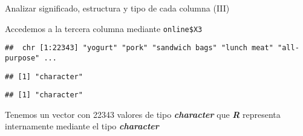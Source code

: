 \documentclass[
  ignorenonframetext,
]{beamer}
\newenvironment{Shaded}{\begin{snugshade}}{\end{snugshade}}
\newcommand{\KeywordTok}[1]{\textcolor[rgb]{0.13,0.29,0.53}{\textbf{#1}}}
\newcommand{\NormalTok}[1]{#1}
\newcommand{\OperatorTok}[1]{\textcolor[rgb]{0.81,0.36,0.00}{\textbf{#1}}}
\begin{document}
\begin{frame}[fragile]{Analizar significado, estructura y tipo de cada
columna (III)}
\protect\hypertarget{analizar-significado-estructura-y-tipo-de-cada-columna-iii}{}

Accedemos a la tercera columna mediante \texttt{online\$X3}

\begin{Shaded}
\end{Shaded}

\begin{verbatim}
##  chr [1:22343] "yogurt" "pork" "sandwich bags" "lunch meat" "all- purpose" ...
\end{verbatim}

\begin{Shaded}
\end{Shaded}

\begin{verbatim}
## [1] "character"
\end{verbatim}

\begin{Shaded}
\end{Shaded}

\begin{verbatim}
## [1] "character"
\end{verbatim}

Tenemos un vector con 22343 valores de tipo \textbf{\emph{character}}
que \textbf{\emph{R}} representa internamente mediante el tipo
\textbf{\emph{character}}

\end{frame}
\end{document}
